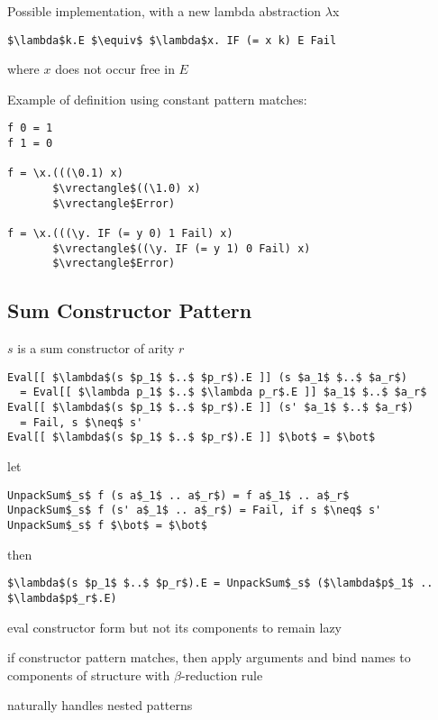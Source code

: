 \documentclass[8pt]{extarticle}
\newcommand*{\vrectangle}{{\setlength{\fboxsep}{0pt}\fbox{\phantom{l}}}}
\begin{document}
\begin{multicols*}{2}
Possible implementation, with a new lambda abstraction $\lambda$x
\begin{lstlisting}
$\lambda$k.E $\equiv$ $\lambda$x. IF (= x k) E Fail
\end{lstlisting}
where $x$ does not occur free in $E$

Example of definition using constant pattern matches:
\begin{lstlisting}
f 0 = 1
f 1 = 0

f = \x.(((\0.1) x)
       $\vrectangle$((\1.0) x)
       $\vrectangle$Error)

f = \x.(((\y. IF (= y 0) 1 Fail) x)
       $\vrectangle$((\y. IF (= y 1) 0 Fail) x)
       $\vrectangle$Error)
\end{lstlisting}

    
\subsection{Sum Constructor Pattern}

$s$ is a sum constructor of arity $r$

\begin{lstlisting}
Eval[[ $\lambda$(s $p_1$ $..$ $p_r$).E ]] (s $a_1$ $..$ $a_r$)
  = Eval[[ $\lambda p_1$ $..$ $\lambda p_r$.E ]] $a_1$ $..$ $a_r$
Eval[[ $\lambda$(s $p_1$ $..$ $p_r$).E ]] (s' $a_1$ $..$ $a_r$)
  = Fail, s $\neq$ s'
Eval[[ $\lambda$(s $p_1$ $..$ $p_r$).E ]] $\bot$ = $\bot$
\end{lstlisting}

let

\begin{lstlisting}
UnpackSum$_s$ f (s a$_1$ .. a$_r$) = f a$_1$ .. a$_r$
UnpackSum$_s$ f (s' a$_1$ .. a$_r$) = Fail, if s $\neq$ s'
UnpackSum$_s$ f $\bot$ = $\bot$
\end{lstlisting}

then

\begin{lstlisting}
$\lambda$(s $p_1$ $..$ $p_r$).E = UnpackSum$_s$ ($\lambda$p$_1$ .. $\lambda$p$_r$.E)
\end{lstlisting}

eval constructor form but not its components to remain lazy

if constructor pattern matches, then apply arguments and bind names to components of structure with $\beta$-reduction rule

naturally handles nested patterns

\vfill\null
\columnbreak


\end{multicols*}
\end{document}
